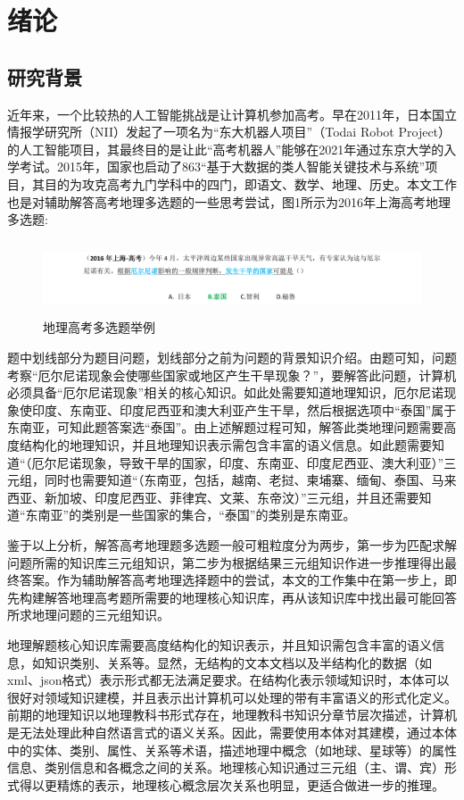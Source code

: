 \chapter{绪论}
\section{研究背景}
近年来，一个比较热的人工智能挑战是让计算机参加高考。早在2011年，日本国立情报学研究所（NII）发起了一项名为“东大机器人项目”（Todai Robot Project）的人工智能项目，其最终目的是让此“高考机器人”能够在2021年通过东京大学的入学考试\cite{Fujita}。2015年，国家也启动了863“基于大数据的类人智能关键技术与系统”项目，其目的为攻克高考九门学科中的四门，即语文、数学、地理、历史\cite{Cheng}。本文工作也是对辅助解答高考地理多选题的一些思考尝试，图1所示为2016年上海高考地理多选题:

\begin{figure}[!htb]
	\centering\includegraphics[height=2.2cm]{resource/ex_multi_choice_ques}
	\caption{地理高考多选题举例}
	\label{fig:ex_multi_choice_ques}
\end{figure}

题中划线部分为题目问题，划线部分之前为问题的背景知识介绍。由题可知，问题考察“厄尔尼诺现象会使哪些国家或地区产生干旱现象？”，要解答此问题，计算机必须具备“厄尔尼诺现象”相关的核心知识。如此处需要知道地理知识，厄尔尼诺现象使印度、东南亚、印度尼西亚和澳大利亚产生干旱，然后根据选项中“泰国”属于东南亚，可知此题答案选“泰国”。由上述解题过程可知，解答此类地理问题需要高度结构化的地理知识，并且地理知识表示需包含丰富的语义信息。如此题需要知道“（厄尔尼诺现象，导致干旱的国家，印度、东南亚、印度尼西亚、澳大利亚）”三元组，同时也需要知道“（东南亚，包括，越南、老挝、柬埔寨、缅甸、泰国、马来西亚、新加坡、印度尼西亚、菲律宾、文莱、东帝汶）”三元组，并且还需要知道“东南亚”的类别是一些国家的集合，“泰国”的类别是东南亚。

鉴于以上分析，解答高考地理题多选题一般可粗粒度分为两步，第一步为匹配求解问题所需的知识库三元组知识，第二步为根据结果三元组知识作进一步推理得出最终答案。作为辅助解答高考地理选择题中的尝试，本文的工作集中在第一步上，即先构建解答地理高考题所需要的地理核心知识库，再从该知识库中找出最可能回答所求地理问题的三元组知识。

地理解题核心知识库需要高度结构化的知识表示，并且知识需包含丰富的语义信息，如知识类别、关系等。显然，无结构的文本文档以及半结构化的数据（如xml、json格式）表示形式都无法满足要求。在结构化表示领域知识时，本体可以很好对领域知识建模，并且表示出计算机可以处理的带有丰富语义的形式化定义\cite{Hitzler}。前期的地理知识以地理教科书形式存在，地理教科书知识分章节层次描述，计算机是无法处理此种自然语言式的语义关系。因此，需要使用本体对其建模，通过本体中的实体、类别、属性、关系等术语，描述地理中概念（如地球、星球等）的属性信息、类别信息和各概念之间的关系。地理核心知识通过三元组（主、谓、宾）形式得以更精炼的表示，地理核心概念层次关系也明显，更适合做进一步的推理。

